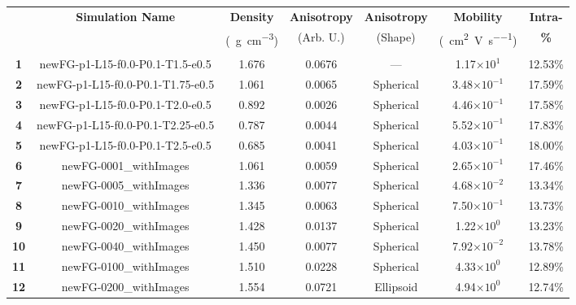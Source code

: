 \documentclass[12pt]{article}
\def\mobunits{\square\centi\meter\per\volt\per\second}
\def\gcm{\gram\per\cubic\centi\meter}
\def\ccg{\cellcolor{gray}}
\begin{document}
\begin{center}
\begin{adjustbox}{max width=\textwidth}
\begin{tabular}{| c | c | c | c | c | c | c |}
\hline
\rule{0pt}{2.5ex} 
\multirow{2}{*}{\textbf{ID}}&\multirow{2}{*}{\textbf{Simulation Name}}&\textbf{Density}&\textbf{Anisotropy}&\textbf{Anisotropy}&\textbf{Mobility}&\textbf{Intra-}\\
                            &&(\SI{}{\gcm})&(Arb. U.)&(Shape)&(\SI{}{\mobunits})&\textbf{\%}\\
\hhline{|=======|}
\multicolumn{7}{| c |}{{\ccg}NewFG Runs}\\
\hhline{|=======|}
\textbf{1}&\rule{0pt}{2.5ex}newFG-p1-L15-f0.0-P0.1-T1.5-e0.5& 1.676& 0.0676& ---&1.17$\times 10^{1}$&12.53\%\\
{\ccg}\textbf{2}&{\ccg}\rule{0pt}{2.5ex}newFG-p1-L15-f0.0-P0.1-T1.75-e0.5&{\ccg}1.061&{\ccg}0.0065&{\ccg}Spherical&{\ccg}3.48$\times 10^{-1}$&{\ccg}17.59\%\\
\textbf{3}&\rule{0pt}{2.5ex}newFG-p1-L15-f0.0-P0.1-T2.0-e0.5& 0.892& 0.0026& Spherical&4.46$\times 10^{-1}$&17.58\%\\
{\ccg}\textbf{4}&{\ccg}\rule{0pt}{2.5ex}newFG-p1-L15-f0.0-P0.1-T2.25-e0.5&{\ccg}0.787&{\ccg}0.0044&{\ccg}Spherical&{\ccg}5.52$\times 10^{-1}$&{\ccg}17.83\%\\
\textbf{5}&\rule{0pt}{2.5ex}newFG-p1-L15-f0.0-P0.1-T2.5-e0.5& 0.685& 0.0041& Spherical&4.03$\times 10^{-1}$&18.00\%\\
\hhline{|=======|}
{\ccg}\textbf{6}&{\ccg}\rule{0pt}{2.5ex}newFG-0001\_withImages&{\ccg} 1.061&{\ccg} 0.0059&{\ccg} Spherical&{\ccg}2.65$\times 10^{-1}$&{\ccg}17.46\%\\
\textbf{7}&\rule{0pt}{2.5ex}newFG-0005\_withImages&1.336&0.0077&Spherical&4.68$\times 10^{-2}$&13.34\%\\
{\ccg}\textbf{8}&{\ccg}\rule{0pt}{2.5ex}newFG-0010\_withImages&{\ccg} 1.345&{\ccg} 0.0063&{\ccg} Spherical&{\ccg}7.50$\times 10^{-1}$&{\ccg}13.73\%\\
\textbf{9}&\rule{0pt}{2.5ex}newFG-0020\_withImages&1.428&0.0137&Spherical&1.22$\times 10^{0}$&13.23\%\\
{\ccg}\textbf{10}&{\ccg}\rule{0pt}{2.5ex}newFG-0040\_withImages&{\ccg} 1.450&{\ccg} 0.0077&{\ccg} Spherical&{\ccg}7.92$\times 10^{-2}$&{\ccg}13.78\%\\
\textbf{11}&\rule{0pt}{2.5ex}newFG-0100\_withImages&1.510&0.0228&Spherical&4.33$\times 10^{0}$&12.89\%\\
{\ccg}\textbf{12}&{\ccg}\rule{0pt}{2.5ex}newFG-0200\_withImages&{\ccg} 1.554&{\ccg} 0.0721&{\ccg} Ellipsoid&{\ccg}4.94$\times 10^{0}$&{\ccg}12.74\%\\

\end{tabular}
\end{adjustbox}
\end{center}
\end{document}
